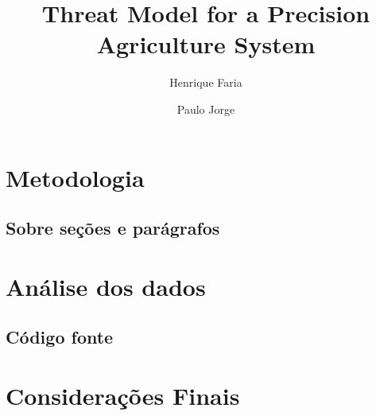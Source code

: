 \documentclass[runningheads]{llncs}
\title{Threat Model for a Precision Agriculture System}
\author{Henrique Faria \and Paulo Jorge}
\institute{Departamento de Informática, Universidade do Minho}
\begin{document}
 

\maketitle

\newpage
\hfill


\section{Metodologia}

\subsection{Sobre seções e parágrafos}

\section{Análise dos dados}\label{sec:analisedosdados}

 




\subsection{Código fonte}





\section{Considerações Finais}




\end{document}
